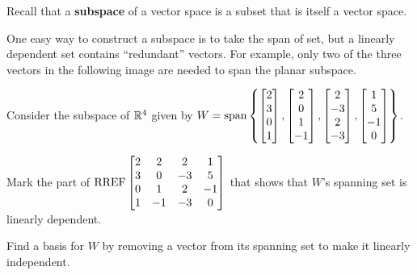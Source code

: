 \begin{observation}
Recall that a \textbf{subspace} of a vector space is a subset that is itself a vector space.

\vspace{1em}

One easy way to construct a subspace is to take the span of set,
but a linearly dependent set contains ``redundant'' vectors. For example,
only two of the three vectors in the following image are needed to span
the planar subspace.

\begin{center}
\end{center}
\end{observation}

\begin{activity}{10}
  Consider the subspace of \(\mathbb{R}^4\) given by \(W=\operatorname{span}\left\{
  \begin{bmatrix}2\\3\\0\\1\end{bmatrix},
  \begin{bmatrix}2\\0\\1\\-1\end{bmatrix},
  \begin{bmatrix}2\\-3\\2\\-3\end{bmatrix},
  \begin{bmatrix}1\\5\\-1\\0\end{bmatrix}
  \right\}
  \).

  \begin{subactivity}
    Mark the part of \(\operatorname{RREF}\begin{bmatrix}
    2&2&2&1\\
    3&0&-3&5\\
    0&1&2&-1\\
    1&-1&-3&0
    \end{bmatrix}\) that shows that \(W\)'s spanning set
    is linearly dependent.
  \end{subactivity}

  \begin{subactivity}
    Find a basis for \(W\) by removing a vector from its spanning set
    to make it linearly independent.
  \end{subactivity}
\end{activity}

